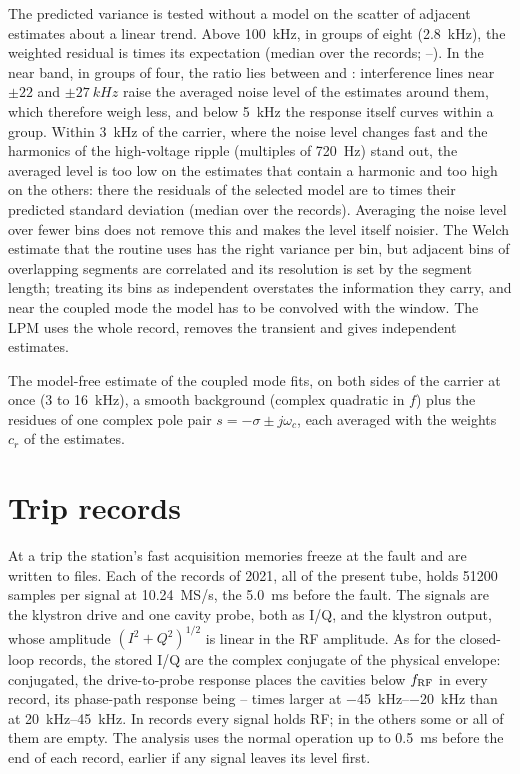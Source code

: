 The predicted variance is tested without a model on the scatter of adjacent estimates about a linear trend. Above \SI{100}{kHz}, in groups of eight (\SI{2.8}{kHz}), the weighted residual is \calibMedian{} times its expectation (median over the records; \calibLo--\calibHi). In the near band, in groups of four, the ratio lies between \calibNearLo{} and \calibNearHi: interference lines near $\pm22$ and $\pm\SI{27}{kHz}$ raise the averaged noise level of the estimates around them, which therefore weigh less, and below \SI{5}{kHz} the response itself curves within a group. Within \SI{3}{kHz} of the carrier, where the noise level changes fast and the harmonics of the high-voltage ripple (multiples of \SI{720}{Hz}) stand out, the averaged level is too low on the estimates that contain a harmonic and too high on the others: there the residuals of the selected model are \nearCalLo{} to \nearCalHi{} times their predicted standard deviation (median over the records). Averaging the noise level over fewer bins does not remove this and makes the level itself noisier. The Welch estimate that the routine uses has the right variance per bin, but adjacent bins of overlapping segments are correlated and its resolution is set by the segment length; treating its bins as independent overstates the information they carry, and near the coupled mode the model has to be convolved with the window. The LPM uses the whole record, removes the transient and gives independent estimates.

The model-free estimate of the coupled mode fits, on both sides of the carrier at once (3 to \SI{16}{kHz}), a smooth background (complex quadratic in $f$) plus the residues of one complex pole pair $s=-\sigma\pm j\omega_c$, each averaged with the weights $c_r$ of the estimates.

\section{Trip records}\label{app:trips}

At a trip the station's fast acquisition memories freeze at the fault and are written to files. Each of the \tripN{} records of 2021, all of the present tube, holds \num{51200} samples per signal at \SI{10.24}{MS/s}, the \SI{5.0}{ms} before the fault. The signals are the klystron drive and one cavity probe, both as I/Q, and the klystron output, whose amplitude $(I^2+Q^2)^{1/2}$ is linear in the RF amplitude. As for the closed-loop records, the stored I/Q are the complex conjugate of the physical envelope: conjugated, the drive-to-probe response places the cavities below $f_\mathrm{RF}$ in every record, its phase-path response being \tripAsymLo--\tripAsymHi{} times larger at \SIrange{-45}{-20}{kHz} than at \SIrange{20}{45}{kHz}. In \tripUsed{} records every signal holds RF; in the others some or all of them are empty. The analysis uses the normal operation up to \SI{0.5}{ms} before the end of each record, earlier if any signal leaves its level first.

